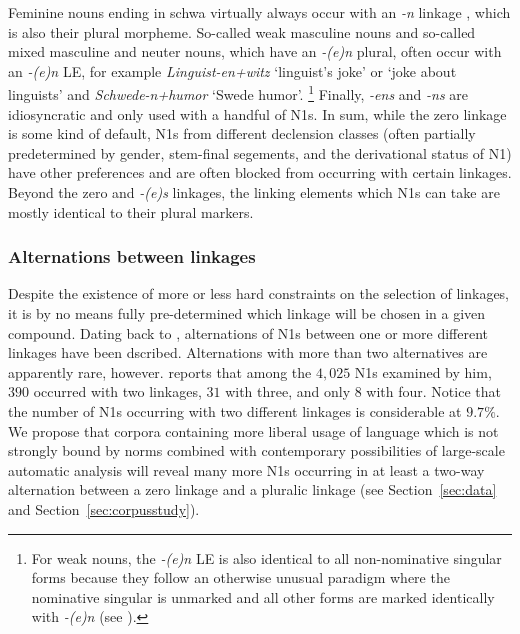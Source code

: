 Feminine nouns ending in schwa virtually always occur with an \textit{-n} linkage \parencite[32]{LibbenEa2002}, which is also their plural morpheme.
So-called weak masculine nouns and so-called mixed masculine and neuter nouns, which have an \textit{-(e)n} plural, often occur with an \textit{-(e)n} LE, for example \textit{Linguist-en+witz} `linguist's joke' or `joke about linguists' and \textit{Schwede-n+humor} `Swede humor'.%
\footnote{For weak nouns, the \textit{-(e)n} LE is also identical to all non-nominative singular forms because they follow an otherwise unusual paradigm where the nominative singular is unmarked and all other forms are marked identically with \textit{-(e)n} (see \citealt{Koepcke1995,Schaefer2016c}).}
Finally, \textit{-ens} and \textit{-ns} are idiosyncratic and only used with a handful of N1s.
In sum, while the zero linkage is some kind of default, N1s from different declension classes (often partially predetermined by gender, stem-final segements, and the derivational status of N1) have other preferences and are often blocked from occurring with certain linkages.
Beyond the zero and \textit{-(e)s} linkages, the linking elements which N1s can take are mostly identical to their plural markers.


\subsubsection{Alternations between linkages}

Despite the existence of more or less hard constraints on the selection of linkages, it is by no means fully pre-determined which linkage will be chosen in a given compound.
Dating back to \textcite{Augst1975}, alternations of N1s between one or more different linkages have been dscribed.
Alternations with more than two alternatives are apparently rare, however.
\textcite[134--135]{Augst1975} reports that among the $4,025$ N1s examined by him, $390$ occurred with two linkages, $31$ with three, and only $8$ with four.
Notice that the number of N1s occurring with two different linkages is considerable at $9.7\%$.
We propose that corpora containing more liberal usage of language which is not strongly bound by norms combined with contemporary possibilities of large-scale automatic analysis will reveal many more N1s occurring in at least a two-way alternation between a zero linkage and a pluralic linkage (see Section~\ref{sec:data} and Section~\ref{sec:corpusstudy}).

